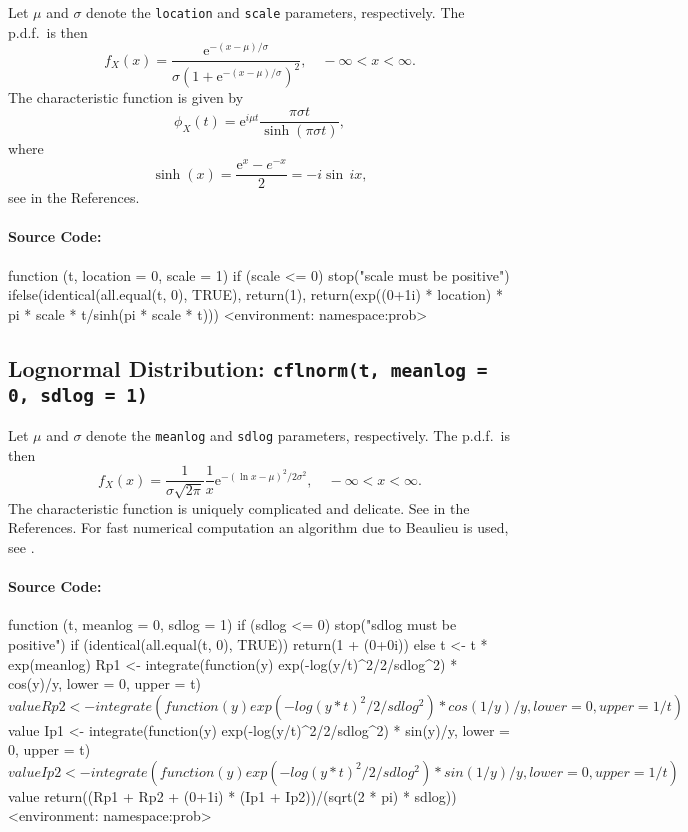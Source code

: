 \documentclass[english]{article}
\newcommand{\me}{\mathrm{e}}
\begin{document}
Let $\mu$ and $\sigma$ denote the \texttt{location} and \texttt{scale}
parameters, respectively. The p.d.f.~is then\[
f_{X}(x)=\frac{\me^{-(x-\mu)/\sigma}}{\sigma\left(1+\me^{-(x-\mu)/\sigma}\right)^{2}},\quad-\infty<x<\infty.\]
The characteristic function is given by\[
\phi_{X}(t)=\me^{i\mu t}\frac{\pi\sigma t}{\sinh(\pi\sigma t)},\]
where\[
\sinh(x)=\frac{\me^{x}-e^{-x}}{2}=-i\sin\, ix,\]
see \cite{hyperbolic} in the References.


\paragraph*{Source Code:}

\begin{Schunk}
\begin{Soutput}
function (t, location = 0, scale = 1) 
{
    if (scale <= 0) 
        stop("scale must be positive")
    ifelse(identical(all.equal(t, 0), TRUE), return(1), return(exp((0+1i) * 
        location) * pi * scale * t/sinh(pi * scale * t)))
}
<environment: namespace:prob>
\end{Soutput}
\end{Schunk}


\subsection{Lognormal Distribution: \texttt{cflnorm(t, meanlog = 0, sdlog = 1)}}

Let $\mu$ and $\sigma$ denote the \texttt{meanlog} and \texttt{sdlog}
parameters, respectively. The p.d.f.~is then\[
f_{X}(x)=\frac{1}{\sigma\sqrt{2\pi}}\frac{1}{x}\me^{-(\ln x-\mu)^{2}/2\sigma^{2}},\quad-\infty<x<\infty.\]
The characteristic function is uniquely complicated and delicate.
See \cite{lnormCF} in the References. For fast numerical computation
an algorithm due to Beaulieu is used, see \cite{clnorm}. 


\paragraph*{Source Code:}

\begin{Schunk}
\begin{Soutput}
function (t, meanlog = 0, sdlog = 1) 
{
    if (sdlog <= 0) 
        stop("sdlog must be positive")
    if (identical(all.equal(t, 0), TRUE)) {
        return(1 + (0+0i))
    }
    else {
        t <- t * exp(meanlog)
        Rp1 <- integrate(function(y) exp(-log(y/t)^2/2/sdlog^2) * 
            cos(y)/y, lower = 0, upper = t)$value
        Rp2 <- integrate(function(y) exp(-log(y * t)^2/2/sdlog^2) * 
            cos(1/y)/y, lower = 0, upper = 1/t)$value
        Ip1 <- integrate(function(y) exp(-log(y/t)^2/2/sdlog^2) * 
            sin(y)/y, lower = 0, upper = t)$value
        Ip2 <- integrate(function(y) exp(-log(y * t)^2/2/sdlog^2) * 
            sin(1/y)/y, lower = 0, upper = 1/t)$value
        return((Rp1 + Rp2 + (0+1i) * (Ip1 + Ip2))/(sqrt(2 * pi) * 
            sdlog))
    }
}
<environment: namespace:prob>
\end{Soutput}
\end{Schunk}
\end{document}
